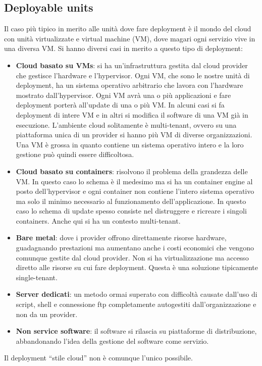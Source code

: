 \subsection{Deployable units}
Il caso più tipico in merito alle unità dove fare deployment è il mondo del cloud
con unità virtualizzate e virtual machine (VM), dove magari ogni servizio vive in
una diversa VM. Si hanno diversi casi in merito a questo tipo di deployment:
\begin{itemize}
      \item \textbf{Cloud basato su VMs}: si ha un'infrastruttura gestita
            dal cloud provider che gestisce l'hardware e l'hypervisor. Ogni VM,
            che sono le nostre unità di deployment, ha un sistema operativo
            arbitrario che lavora con l'hardware mostrato dall'hypervisor. Ogni
            VM avrà una o più applicazioni e fare deployment porterà all'update
            di una o più VM. In alcuni casi si fa deployment di intere VM e in
            altri si modifica il software di una VM già in esecuzione. L'ambiente
            cloud solitamente è multi-tenant, ovvero su una piattaforma unica di
            un provider si hanno più VM di diverse organizzazioni.
            Una VM è grossa in quanto contiene un sistema operativo intero e la
            loro gestione può quindi essere difficoltosa.
      \item \textbf{Cloud basato su containers}: risolvono il problema della
            grandezza delle VM. In questo caso lo schema è il medesimo ma si ha
            un container engine al posto dell'hypervisor e ogni container non
            contiene l'intero sistema operativo ma solo il minimo necessario al
            funzionamento dell'applicazione. In questo caso lo schema di update
            spesso consiste nel distruggere e ricreare i singoli containers.
            Anche qui si ha un contesto multi-tenant.
      \item \textbf{Bare metal}: dove i provider offrono direttamente risorse
            hardware, guadagnando prestazioni ma aumentano anche i costi economici
            che vengono comunque gestite dal cloud provider. Non si ha
            virtualizzazione ma accesso diretto alle risorse su cui fare
            deployment. Questa è una soluzione tipicamente single-tenant.
      \item \textbf{Server dedicati}: un metodo ormai superato con difficoltà
            causate dall'uso di script, shell e connessione ftp completamente 
            autogestiti dall'organizzazione e non da un provider.
      \item \textbf{Non service software}: il software si rilascia su piattaforme
            di distribuzione, abbandonando l'idea della gestione del software
            come servizio.
\end{itemize}
Il deployment “stile cloud” non è comunque l'unico possibile.
